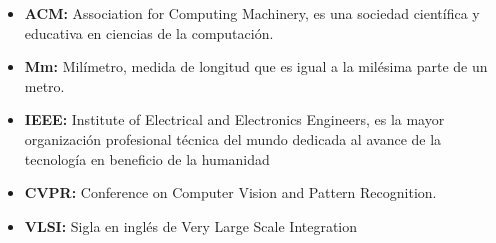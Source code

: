 \begin{itemize}


\item \textbf{ACM:} Association for Computing Machinery, es una sociedad científica y educativa en
ciencias de la computación.

\item \textbf{Mm:} Milímetro, medida de longitud que es igual a la milésima parte de un metro.

\item \textbf{IEEE:} Institute of Electrical and Electronics Engineers, es la mayor organización
profesional técnica del mundo dedicada al avance de la tecnología en beneficio de la
humanidad

\item \textbf{CVPR:} Conference on Computer Vision and Pattern Recognition.

\item \textbf{VLSI:} Sigla en inglés de Very Large Scale Integration

\end{itemize}
